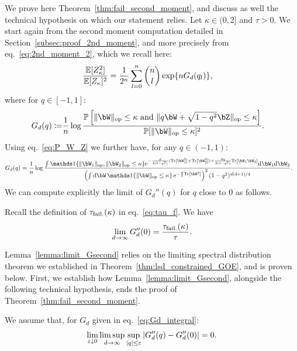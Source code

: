 We prove here Theorem~\ref{thm:fail_second_moment}, and discuss as well the technical hypothesis on which our statement relies.
Let $\kappa \in (0, 2]$ and $\tau > 0$. We start again from the second moment computation detailed in Section~\ref{subsec:proof_2nd_moment}, 
and more precisely from eq.~\eqref{eq:2nd_moment_2}, which we recall here:
\begin{align}\label{eq:2nd_moment_recall}
    \frac{\mathbb{E}[Z_\kappa^2]}{\mathbb{E}[Z_\kappa]^2} &= \frac{1}{2^n} \sum_{l=0}^n \binom{n}{l} \exp\{n G_d(q_l)\}, 
\end{align}
where for $q \in [-1,1]$:
\begin{align*}
    G_d(q) \coloneqq&  
    \frac{1}{n} \log \frac{\bbP\left[\|\bW\|_\op \leq \kappa \textrm{ and } \|q \bW + \sqrt{1-q^2} \bZ\|_\op \leq \kappa\right]}{\bbP[\|\bW\|_\op \leq \kappa]^2}.
\end{align*}
Using eq.~\eqref{eq:P_W_Z} we further have, for any $q \in (-1,1)$:
\begin{align}\label{eq:Gd_integral}
    G_d(q) &= \frac{1}{n} \log \frac{\int \indi\{\|\bW_1\|_\op, \|\bW_2\|_\op \leq \kappa\} e^{-\frac{d}{4(1-q^2)} (\Tr[\bW_1^2] + \Tr[\bW_2^2]) + \frac{dq}{2(1-q^2)} \Tr[\bW_1 \bW_2]} \rd \bW_1 \rd \bW_2}{\left(\int \rd \bW \, \indi\{\|\bW \|_\op \leq \kappa\} \, e^{-\frac{d}{4}\Tr[\bW^2]}\right)^2 (1-q^2)^{d(d+1)/4}}.
\end{align}
We can compute explicitly the limit of $G_d''(q)$ for $q$ close to $0$ as follows.
\begin{lemma}\label{lemma:limit_Gsecond}
    Recall the definition of $\tau_{\rm fail.}(\kappa)$ in eq.~\eqref{eq:tau_f}. We have
    \begin{equation*}
        \lim_{d \to \infty} G_d''(0) = \frac{\tau_{\rm fail.}(\kappa)}{\tau}.
    \end{equation*}
\end{lemma}
\noindent
Lemma~\ref{lemma:limit_Gsecond} relies on the limiting spectral distribution theorem we established in Theorem~\ref{thm:lsd_constrained_GOE}, 
and is proven below. First, we establish how Lemma~\ref{lemma:limit_Gsecond}, 
alongside the following technical hypothesis,
ends the proof of Theorem~\ref{thm:fail_second_moment}.
\begin{hypothesis}\label{hyp:control_Gsecond}
    We assume that, for $G_d$ given in eq.~\eqref{eq:Gd_integral}:
    \begin{equation*}
        \lim_{\varepsilon \downarrow 0}\limsup_{d \to \infty} \sup_{|q| \leq \varepsilon} |G_d''(q) - G_d''(0)| = 0.
    \end{equation*}
\end{hypothesis}
